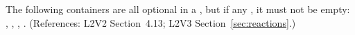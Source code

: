The following containers are all optional in a \Reaction, but if any
, it must not be empty: ,
, , .
(References: L2V2 Section~4.13; L2V3 Section~\ref{sec:reactions}.)
